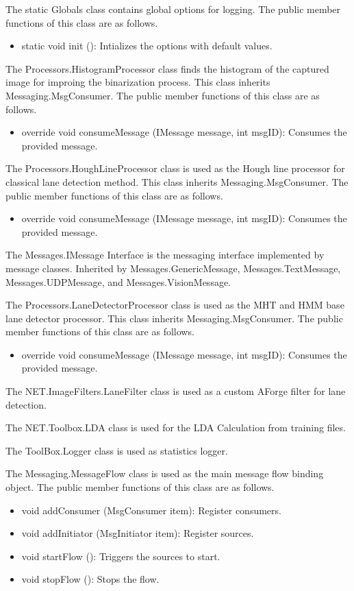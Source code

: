 \documentclass[a4paper,oneside,12pt]{report}
\begin{document}
The static Globals class contains global options for logging.  
The public member functions of this class are as follows.
\begin{itemize}
\item static void init (): Intializes the options with default values. 
\end{itemize}

The Processors.HistogramProcessor class finds the histogram of the captured image for improing the binarization process.
This class inherits Messaging.MsgConsumer. The public member functions of this class are as follows.
\begin{itemize}
\item override void consumeMessage (IMessage message, int msgID): Consumes the provided message. 
\end{itemize}

The Processors.HoughLineProcessor class is used as the Hough line processor for classical lane detection method.
This class inherits Messaging.MsgConsumer. The public member functions of this class are as follows.
\begin{itemize}
\item override void consumeMessage (IMessage message, int msgID): Consumes the provided message. 
\end{itemize}

The Messages.IMessage Interface is the messaging interface implemented by message classes.
Inherited by Messages.GenericMessage, Messages.TextMessage, \\
Messages.UDPMessage, and Messages.VisionMessage.

The Processors.LaneDetectorProcessor class is used as the  MHT and HMM base lane detector processor.
This class inherits Messaging.MsgConsumer. The public member functions of this class are as follows.
\begin{itemize}
\item override void consumeMessage (IMessage message, int msgID): Consumes the provided message. 
\end{itemize}

The NET.ImageFilters.LaneFilter class is used as a custom AForge filter for lane detection. 

The NET.Toolbox.LDA class is used for the LDA Calculation from training files. 

The ToolBox.Logger class is used as statistics logger. 

The Messaging.MessageFlow class is used as the main message flow binding object.
The public member functions of this class are as follows.
\begin{itemize}
\item void addConsumer (MsgConsumer item): Register consumers. 
\item void addInitiator (MsgInitiator item): Register sources. 
\item void startFlow (): Triggers the sources to start. 
\item void stopFlow (): Stops the flow. 
\end{itemize}
\end{document}
